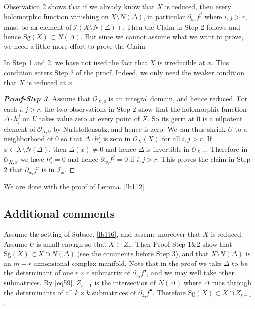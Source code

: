 \documentclass[12pt,b5paper,notitlepage]{report}
\theoremstyle{definition}
\theoremstyle{plain}
\newcommand{\mc}{\mathcal}
\newcommand{\scr}{\mathscr}
\newcommand{\blt}{\bullet}
\newcommand{\Sg}{\mathrm{Sg}}
\numberwithin{equation}{section}
\begin{document}
Observation 2 shows that if we already know that $X$ is reduced, then every holomorphic function vanishing on $X\setminus N(\varDelta)$, in particular $\partial_{w_i}f^j$ where $i,j>r$, must be an element of $\mc I(X\setminus N(\varDelta))$. Then the Claim in Step 2 follows and hence $\Sg(X)\subset N(\varDelta)$. But since we cannot assume what we want to prove, we need a little more effort to prove the Claim.



In Step 1 and 2, we have not used the fact that $X$ is irreducible at $x$. This condition enters Step 3 of the proof. Indeed, we only need the weaker condition that $X$ is reduced at $x$.


\begin{proof}[\textbf{Proof-Step 3}]
Assume that $\scr O_{X,0}$ is an integral domain, and hence reduced. For each $i,j>r$, the two observations in Step 2 show that the holomorphic function $\varDelta\cdot h_i^j$ on $U$ takes value zero at every point of $X$. So its germ at $0$ is a nilpotent element of $\scr O_{X,0}$ by Nullstellensatz, and hence is zero. We can thus shrink $U$ to a neighborhood of $0$ so that $\varDelta\cdot h_i^j$ is zero in $\scr O_X(X)$ for all $i,j>r$. If $x\in X\setminus N(\varDelta)$, then $\varDelta(x)\neq 0$ and hence $\varDelta$ is invertible in $\scr O_{X,x}$. Therefore in $\scr O_{X,x}$ we have $h_i^j=0$ and hence $\partial_{w_i}f^j=0$ if $i,j>r$. This proves the claim in Step 2 that $\partial_{w_i}f^j$ is in $\mc I_x$.
\end{proof}

We are done with the proof of Lemma. \ref{lb112}.


\subsection{Additional comments}

Assume the setting of Subsec. \ref{lb116}, and assume moreover that $X$ is reduced. Assume $U$ is small enough so that $X\subset Z_r$. Then Proof-Step 1\&2 show that $\Sg(X)\subset X\cap N(\varDelta)$ (see the comments before Step 3), and that $X\setminus N(\varDelta)$ is an $m-r$ dimensional complex manifold.  Note that in the proof we take $\varDelta$ to be the determinant of one $r\times r$ submatrix of $\partial_{z_\blt}f^\blt$, and we may well take other submatrices. By \eqref{eq59},  $Z_{r-1}$ is the intersection of $N(\varDelta)$ where $\varDelta$ runs through the determinants of all $k\times k$ submatrices of $\partial_{z_\blt}f^\blt$. Therefore $\Sg(X)\subset X\cap Z_{r-1}$.
\end{document}
